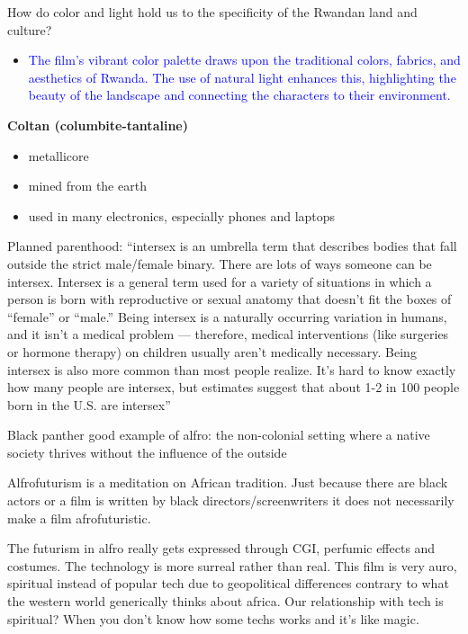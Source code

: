 \documentclass[11pt,fleqn]{book}
\begin{document}
\begin{exercise}
How do color and light hold us to the specificity of the Rwandan land and culture?
\begin{itemize}
\item \textcolor{blue}{The film's vibrant color palette draws upon the traditional colors, fabrics, and aesthetics of Rwanda. The use of natural light enhances this, highlighting the beauty of the landscape and connecting the characters to their environment.}
\end{itemize}
\end{exercise}

\textbf{Coltan (columbite-tantaline)}
\begin{itemize}
    \item metallicore
    \item mined from the earth
    \item used in many electronics, especially phones and laptops
\end{itemize}


Planned parenthood: \enquote{intersex is an umbrella term that describes bodies that fall outside the strict
male/female binary. There are lots of ways someone can be intersex.
Intersex is a general term used for a variety of situations in which a person is
born with reproductive or sexual anatomy that doesn’t fit the boxes of “female”
or “male.”
Being intersex is a naturally occurring variation in humans, and it isn’t a medical
problem — therefore, medical interventions (like surgeries or hormone therapy)
on children usually aren’t medically necessary. Being intersex is also more
common than most people realize. It’s hard to know exactly how many people
are intersex, but estimates suggest that about 1-2 in 100 people born in the U.S.
are intersex}

\begin{remark}
    Black panther good example of alfro: the non-colonial setting where a native society thrives without the influence of the outside
\end{remark}
\begin{remark}
    Alfrofuturism is a meditation on African tradition. Just because there are black actors or a film is written by black directors/screenwriters it does not necessarily make a film afrofuturistic.
\end{remark}
\begin{remark}
    The futurism in alfro really gets expressed through CGI, perfumic effects and costumes. The technology is more surreal rather than real. This film is very auro, spiritual instead of popular tech due to geopolitical differences contrary to what the western world generically thinks about africa. Our relationship with tech is spiritual? When you don't know how some techs works and it's like magic.
\end{remark}
\end{document}
